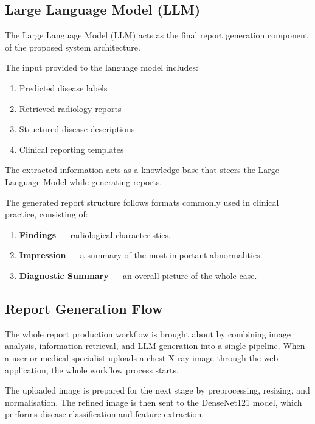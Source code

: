 \subsection{Large Language Model (LLM)}

The Large Language Model (LLM) acts as the final report generation component of the
proposed system architecture.

The input provided to the language model includes:

\begin{enumerate}
    \item Predicted disease labels
    \item Retrieved radiology reports
    \item Structured disease descriptions
    \item Clinical reporting templates
\end{enumerate}

The extracted information acts as a knowledge base that steers the Large Language Model
while generating reports.

The generated report structure follows formats commonly used in clinical practice, consisting
of:

\begin{enumerate}
    \item \textbf{Findings} --- radiological characteristics.
    \item \textbf{Impression} --- a summary of the most important abnormalities.
    \item \textbf{Diagnostic Summary} --- an overall picture of the whole case.
\end{enumerate}

\subsection{Report Generation Flow}

The whole report production workflow is brought about by combining image analysis,
information retrieval, and LLM generation into a single pipeline. When a user or medical
specialist uploads a chest X-ray image through the web application, the whole workflow
process starts.

The uploaded image is prepared for the next stage by preprocessing, resizing, and
normalisation. The refined image is then sent to the DenseNet121 model, which performs
disease classification and feature extraction.

